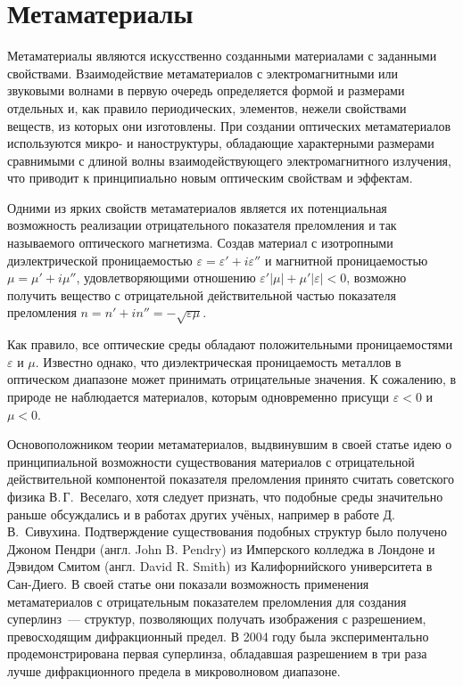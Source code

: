\section{Метаматериалы}

Метаматериалы являются искусственно созданными материалами с заданными свойствами. Взаимодействие метаматериалов с электромагнитными или звуковыми \cite{Zhang2009} волнами в первую очередь определяется формой и размерами отдельных и, как правило периодических, элементов, нежели свойствами веществ, из которых они изготовлены. При создании оптических метаматериалов используются микро- и наноструктуры, обладающие характерными размерами сравнимыми с длиной волны взаимодействующего электромагнитного излучения, что приводит к принципиально новым оптическим свойствам и эффектам.

Одними из ярких свойств метаматериалов является их потенциальная возможность реализации отрицательного показателя преломления и так называемого оптического магнетизма. Создав материал с изотропными диэлектрической проницаемостью $\varepsilon = \varepsilon' + i\varepsilon''$ и магнитной проницаемостью $\mu = \mu' + i\mu''$, удовлетворяющими отношению $\varepsilon'\left|\mu\right| + \mu'\left|\varepsilon\right| < 0$, возможно получить вещество с отрицательной действительной частью показателя преломления $n = n' + in'' = -\sqrt{\varepsilon\mu}$. 

Как правило, все оптические среды обладают положительными проницаемостями $\varepsilon$ и $\mu$. Известно однако, что диэлектрическая проницаемость металлов в оптическом диапазоне может принимать отрицательные значения. К сожалению, в природе не наблюдается материалов, которым одновременно присущи $\varepsilon < 0$ и $\mu < 0$.

Основоположником теории метаматериалов, выдвинувшим в своей статье \cite{Veselago1967} идею о принципиальной возможности существования материалов с отрицательной действительной компонентой показателя преломления принято считать советского физика В.\,Г.~Веселаго, хотя следует признать, что подобные среды значительно раньше обсуждались и в работах других учёных, например в работе \cite{Sivoukhin1957} Д.\,В.~Сивухина. Подтверждение существования подобных структур было получено Джоном Пендри (англ. John B. Pendry) из Имперского колледжа в Лондоне и Дэвидом Смитом (англ. David R. Smith) из Калифорнийского университета в Сан-Диего. В своей статье \cite{Pendry2000} они показали возможность применения метаматериалов с отрицательным показателем преломления для создания суперлинз~--- структур, позволяющих получать изображения с разрешением, превосходящим дифракционный предел. В 2004 году была экспериментально продемонстрирована \cite{Grbic2004} первая суперлинза, обладавшая разрешением в три раза лучше дифракционного предела в микроволновом диапазоне.